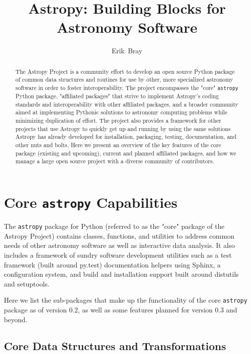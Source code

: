 \documentclass[11pt,twoside]{article}
\begin{document}
\title{Astropy: Building Blocks for Astronomy Software}

\author{Erik~Bray
}

\begin{abstract}
The Astropy Project is a community effort to develop an open source Python
package of common data structures and routines for use by other, more
specialized astronomy software in order to foster interoperability.
The project encompasses the "core" \texttt{astropy} Python package, "affiliated
packages" that strive to implement Astropy's coding standards and
interoperability with other affiliated packages, and a broader community aimed
at implementing Pythonic solutions to astronomy computing problems while
minimizing duplication of effort.  The project also provides a framework for
other projects that use Astropy to quickly get up and running by using the same
solutions Astropy has already developed for installation, packaging, testing,
documentation, and other nuts and bolts.
Here we present an overview of the key features of the core package (existing
and upcoming), current and planned affiliated packages, and how we manage a
large open source project with a diverse community of contributors.
\end{abstract}

\section{Core \texttt{astropy} Capabilities}

The \texttt{astropy} package for Python (referred to as the "core" package of
the Astropy Project) contains classes, functions, and utilities to address
common needs of other astronomy software as well as interactive data analysis.
It also includes a framework of sundry software development utilities such as a
test framework (built around py.test) documentation helpers using Sphinx, a
configuration system, and build and installation support built around distutils
and setuptools.

Here we list the sub-packages that make up the functionality of the core
\texttt{astropy} package as of version 0.2, as well as some features planned
for version 0.3 and beyond.

\subsection{Core Data Structures and Transformations}
\end{document}
